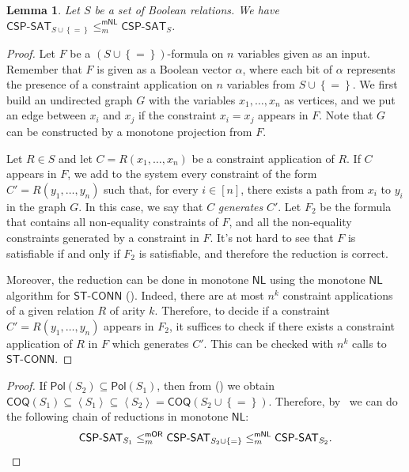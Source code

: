 \documentclass[10pt,a4paper]{article}
\newtheorem{lemma}[theorem]{Lemma}
\newcommand{\complexityfont}[1]{\mathsf{#1}}
\newcommand{\monclass}[1]{\mathsf{m}#1}
\newcommand\NL           {\complexityfont{NL}}
\def\mNL          {\monclass{\NL}}
\def\sseq{\subseteq}
\newcommand{\set}[1]{\left\{#1\right\}}
\newcommand{\brkt}[1]{\left\langle #1 \right\rangle}
\newcommand{\stconn}{\mathsf{ST\text{-}CONN}}
\newcommand{\CSPf}[1]{\mathsf{CSP}\text{-}\mathsf{SAT}_{#1}}
\newcommand{\COQ}{\mathsf{COQ}}
\newcommand{\Pol}{\mathsf{Pol}}
\newcommand{\ccln}[1]{\brkt{#1}}
\newcommand{\mnlmred}{\leq^{\mNL}_m}
\newcommand{\mormred}{\leq^{\mathsf{mOR}}_m}
\begin{document}
\begin{lemma}
    \label{prop:eql}
    Let $S$ be a set of Boolean relations.
    We have
    $\CSPf{S \cup \set{=}} \mnlmred \CSPf{S}$.
\end{lemma}
\begin{proof}
    Let $F$ be a $(S \cup \set{=})$-formula on $n$ variables
    given as an input.
    Remember that $F$ is given as a Boolean vector $\alpha$,
    where each bit of $\alpha$
    represents
    the presence of a constraint application on $n$ variables
    from $S \cup \set{=}$.
    We first build an undirected graph $G$ with the variables
    $x_1,\dots,x_n$ as vertices,
    and we put an edge between $x_i$ and $x_j$
    if the constraint $x_i = x_j$ appears in $F$.
    Note that $G$ can be constructed by a monotone projection from
    $F$.

    Let $R \in S$ and let
    $C = R(x_1,\dots,x_n)$ be a constraint application of $R$.
    If $C$ appears in $F$,
    we add to the system every constraint of the form
    $C' = R(y_1,\dots,y_n)$
    such that,
    for every $i \in [n]$,
    there exists a path from $x_i$ to $y_i$ in the graph $G$.
    In this case, we say that $C$ \emph{generates} $C'$.
    Let $F_2$ be the formula that contains all
    non-equality constraints of $F$,
    and all the non-equality constraints
    generated by a constraint in $F$.
    It's not hard to see that 
    $F$ is satisfiable if and only if $F_2$ is satisfiable,
    and therefore the reduction is correct.

    Moreover, the reduction can be done in monotone $\NL$
    using the monotone $\NL$ algorithm for $\stconn$
    ().
    Indeed, there are at most $n^k$ constraint applications of a given
    relation $R$ of arity $k$. Therefore,
    to decide if a constraint $C' = R(y_1,\dots,y_n)$ appears in $F_2$,
    it suffices to check if there exists a constraint application 
    of $R$ in $F$ which generates $C'$.
    This can be checked with $n^k$ calls to $\stconn$.
\end{proof}

\polym*
\begin{proof}
    If $\Pol(S_2) \sseq \Pol(S_1)$, then 
    from 
    ()
    we obtain
    $\COQ(S_1) \sseq \ccln{S_1} \sseq \ccln{S_2} = \COQ(S_2 \cup \set{=})$.
    Therefore, by~ 
    we can do the following chain of reductions in monotone $\NL$:
    \begin{equation*}
        \CSPf{S_1}
        \mormred
        \CSPf{S_2 \cup \set{=}}
        \mnlmred
        \CSPf{S_2}.
        \qedhere
    \end{equation*}
\end{proof}
\end{document}
